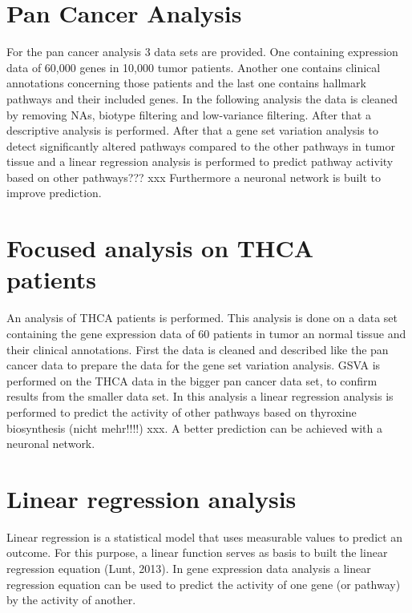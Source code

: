 \documentclass[
  parskip,
  oneside]{scrreprt}
\begin{document}
\hypertarget{pan-cancer-analysis}{%
\section{Pan Cancer Analysis}\label{pan-cancer-analysis}}

For the pan cancer analysis 3 data sets are provided. One containing
expression data of 60,000 genes in 10,000 tumor patients. Another one
contains clinical annotations concerning those patients and the last one
contains hallmark pathways and their included genes. In the following
analysis the data is cleaned by removing NAs, biotype filtering and
low-variance filtering. After that a descriptive analysis is performed.
After that a gene set variation analysis to detect significantly altered
pathways compared to the other pathways in tumor tissue and a linear
regression analysis is performed to predict pathway activity based on
other pathways??? xxx Furthermore a neuronal network is built to improve
prediction.

\hypertarget{focused-analysis-on-thca-patients}{%
\section{Focused analysis on THCA
patients}\label{focused-analysis-on-thca-patients}}

An analysis of THCA patients is performed. This analysis is done on a
data set containing the gene expression data of 60 patients in tumor an
normal tissue and their clinical annotations. First the data is cleaned
and described like the pan cancer data to prepare the data for the gene
set variation analysis. GSVA is performed on the THCA data in the bigger
pan cancer data set, to confirm results from the smaller data set. In
this analysis a linear regression analysis is performed to predict the
activity of other pathways based on thyroxine biosynthesis (nicht
mehr!!!!) xxx. A better prediction can be achieved with a neuronal
network.

\hypertarget{linear-regression-analysis}{%
\section{Linear regression analysis}\label{linear-regression-analysis}}

Linear regression is a statistical model that uses measurable values to
predict an outcome. For this purpose, a linear function serves as basis
to built the linear regression equation (Lunt, 2013). In gene expression
data analysis a linear regression equation can be used to predict the
activity of one gene (or pathway) by the activity of another.
\end{document}
